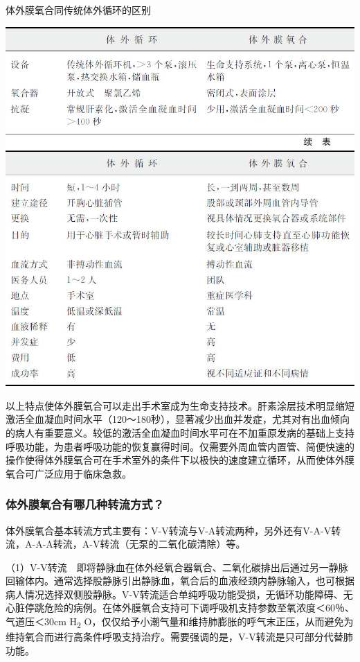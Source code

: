 \begin{table}[htbp]
\centering
\caption{体外膜氧合同传统体外循环的区别}
\label{tab24-1}
\includegraphics{./images/Image00281.jpg}
\includegraphics{./images/Image00282.jpg}
\end{table}




以上特点使体外膜氧合可以走出手术室成为生命支持技术。肝素涂层技术明显缩短激活全血凝血时间水平（120～180秒），显著减少出血并发症，尤其对有出血倾向的病人有重要意义。较低的激活全血凝血时间水平可在不加重原发病的基础上支持呼吸功能，为患者呼吸功能的恢复赢得时间。仅需要外周血管内置管、简便快速的操作使得体外膜氧合可在手术室外的条件下以极快的速度建立循环，从而使体外膜氧合可广泛应用于临床急救。

\subsubsection{体外膜氧合有哪几种转流方式？}

体外膜氧合基本转流方式主要有：V-V转流与V-A转流两种，另外还有V-A-V转流，A-A-A转流，A-V转流（无泵的二氧化碳清除）等。

（1）V-V转流　即将静脉血在体外经氧合器氧合、二氧化碳排出后通过另一静脉回输体内。通常选择股静脉引出静脉血，氧合后的血液经颈内静脉输入，也可根据病人情况选择双侧股静脉。V-V转流适合单纯呼吸功能受损，无循环功能障碍、无心脏停跳危险的病例。在体外膜氧合支持可下调呼吸机支持参数至氧浓度＜60％、气道压＜30cm
H\textsubscript{2}
O，仅仅给予小潮气量和维持肺膨胀的呼气末正压，从而避免为维持氧合而进行高条件呼吸支持治疗。需要强调的是，V-V转流是只可部分代替肺功能。

